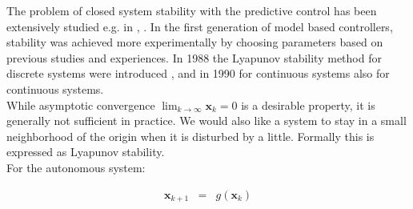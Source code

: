     	The problem of closed system stability with the predictive control has been extensively studied e.g. in \cite{mayne2000constrained}, \cite{grieder2005stabilizing}. In the first generation of model based controllers, stability was achieved more experimentally by choosing parameters based on previous studies and experiences. In 1988 the Lyapunov stability method for discrete systems were introduced \cite{keerthi1988optimal}, and in 1990 for continuous systems \cite{mayne1990receding} also for continuous systems. \\
    While asymptotic convergence $\lim_{k\rightarrow\infty}\textbf{x}_k=0$ is a desirable property, it is generally not sufficient in practice. We would also like a system to stay in a small neighborhood of the origin when it is disturbed by a little. Formally this is expressed as Lyapunov stability.\\
    For the autonomous system:

    \begin{equation}
    \begin{array}{rcl}
            \textbf{x}_{k+1}&=&g(\textbf{x}_k)\\
        \end{array}
        \label{BASICMPC:equ:autonom_system}
    \end{equation}

